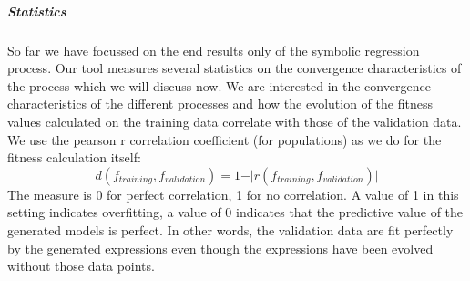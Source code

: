 \subparagraph{Statistics}
So far we have focussed on the end results only of the symbolic regression process. Our tool measures several statistics on the convergence characteristics of the process which we will discuss now.
We are interested in the convergence characteristics of the different processes and how the evolution of the fitness values calculated on the training data correlate with those of the validation data.
We use the pearson r correlation coefficient (for populations) as we do for the fitness calculation itself:
\[
d(f_{training}, f_{validation}) = 1 - \vert r(f_{training}, f_{validation}) \vert
\]
The measure is 0 for perfect correlation, 1 for no correlation. A value of 1 in this setting indicates overfitting, a value of 0 indicates that the predictive value of the generated models is perfect. In other words, the validation data are fit perfectly by the generated expressions even though the expressions have been evolved without those data points.
